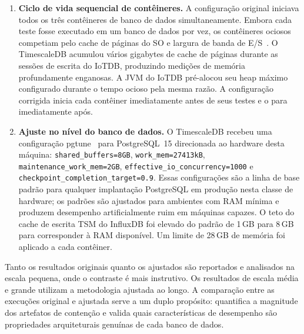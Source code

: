\begin{enumerate}
  \item \textbf{Ciclo de vida sequencial de contêineres.} A configuração original iniciava todos
    os três contêineres de banco de dados simultaneamente. Embora cada teste fosse executado em
    um banco de dados por vez, os contêineres ociosos competiam pelo cache de páginas do SO e
    largura de banda de E/S~\citep{shapira2016pitfalls}. O TimescaleDB acumulou vários gigabytes de cache de páginas durante
    as sessões de escrita do IoTDB, produzindo medições de memória profundamente enganosas. A JVM
    do IoTDB pré-alocou seu heap máximo configurado durante o tempo ocioso pela mesma razão.
    A configuração corrigida inicia cada contêiner imediatamente antes de seus testes e o para
    imediatamente após.

  \item \textbf{Ajuste no nível do banco de dados.} O TimescaleDB recebeu uma configuração
    pgtune~\cite{pgtune} para PostgreSQL~15 direcionada ao hardware desta máquina:
    \texttt{shared\_buffers=8GB}, \texttt{work\_mem=27413kB},
    \texttt{maintenance\_work\_mem=2GB}, \texttt{effective\_io\_concurrency=1000} e
    \texttt{checkpoint\_completion\_target=0.9}. Essas configurações são a linha de base padrão
    para qualquer implantação PostgreSQL em produção nesta classe de hardware; os padrões são
    ajustados para ambientes com RAM mínima e produzem desempenho artificialmente ruim em
    máquinas capazes. O teto do cache de escrita TSM do InfluxDB foi elevado do padrão de 1\,GB
    para 8\,GB para corresponder à RAM disponível. Um limite de 28\,GB de memória foi aplicado a
    cada contêiner.
\end{enumerate}

Tanto os resultados originais quanto os ajustados são reportados e analisados na escala pequena,
onde o contraste é mais instrutivo. Os resultados de escala média e grande utilizam a metodologia
ajustada ao longo. A comparação entre as execuções original e ajustada serve a um duplo
propósito: quantifica a magnitude dos artefatos de contenção e valida quais características de
desempenho são propriedades arquiteturais genuínas de cada banco de dados.
